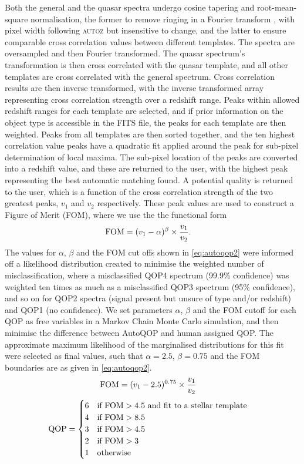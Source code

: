 \documentclass[5p]{elsarticle}
\newcommand{\autoz}{\textsc{autoz}}
\begin{document}
Both the general and the quasar spectra undergo cosine tapering and root-mean-square normalisation, the former to remove ringing in a Fourier transform \citep[apodization;][]{kurtz1998rvsao}, with pixel width following \autoz{} but insensitive to change, and the latter to ensure comparable cross correlation values between different templates. The spectra are oversampled and then Fourier transformed. The quasar spectrum's transformation is then cross correlated with the quasar template, and all other templates are cross correlated with the general spectrum. Cross correlation results are then inverse transformed, with the inverse transformed array representing cross correlation strength over a redshift range. Peaks within allowed redshift ranges for each template are selected, and if prior information on the object type is accessible in the FITS file, the peaks for each template are then weighted. Peaks from all templates are then sorted together, and the ten highest correlation value peaks have a quadratic fit applied around the peak for sub-pixel determination of local maxima. The sub-pixel location of the peaks are converted into a redshift value, and these are returned to the user, with the highest peak representing the best automatic matching found. A potential quality is returned to the user, which is a function of the cross correlation strength of the two greatest peaks, $v_1$ and $v_2$ respectively. These peak values are used to construct a Figure of Merit (FOM), where we use the the functional form
\begin{align}
{\rm FOM} &= (v_1-\alpha)^{\beta} \times \frac{v_1}{v_2}. \label{eq:autoqop}
\end{align}
The values for $\alpha$, $\beta$ and the FOM cut offs shown in \eqref{eq:autoqop2} were informed off a likelihood distribution created to minimise the weighted number of misclassification, where a misclassified QOP4 spectrum (99.9\% confidence) was weighted ten times as much as a misclassified QOP3 spectrum (95\% confidence), and so on for QOP2 spectra (signal present but unsure of type and/or redshift) and QOP1 (no confidence). We set parameters $\alpha$, $\beta$ and the FOM cutoff for each QOP as free variables in a Markov Chain Monte Carlo simulation, and then minimise the difference between AutoQOP and human assigned QOP. The approximate maximum likelihood of the marginalised distributions for this fit were selected as final values, such that $\alpha = 2.5$, $\beta = 0.75$ and the FOM boundaries are as given in \eqref{eq:autoqop2}.
\begin{align}
{\rm FOM} &= (v_1-2.5)^{0.75} \times \frac{v_1}{v_2} \label{eq:autoqop3}
\end{align}
\begin{align}
{\rm QOP} &= \begin{cases}6 & \text{if } {\rm FOM} > 4.5 \text{ and fit to a stellar template} \label{eq:autoqop2}\\
4 & \text{if } {\rm FOM} > 8.5  \\
3 & \text{if } {\rm FOM} > 4.5 \\
2 & \text{if } {\rm FOM} > 3 \\
1 & \text{otherwise} \end{cases}
\end{align}
\end{document}
